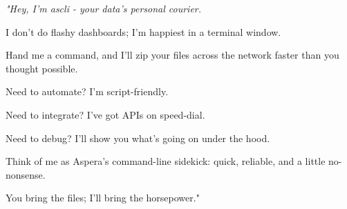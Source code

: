 \thispagestyle{empty}
\vspace*{\fill}
\begin{center}
  

  \vspace{4cm}
  \large
  \itshape
  "Hey, I'm ascli - your data's personal courier.

  I don't do flashy dashboards; I'm happiest in a terminal window.

  Hand me a command, and I'll zip your files across the network faster than you thought possible.

  Need to automate? I'm script-friendly.

  Need to integrate? I've got APIs on speed-dial.

  Need to debug? I'll show you what's going on under the hood.

  Think of me as Aspera's command-line sidekick: quick, reliable, and a little no-nonsense.

  You bring the files; I'll bring the horsepower."
  \normalsize
\end{center}
\vspace*{4cm}
\newpage
